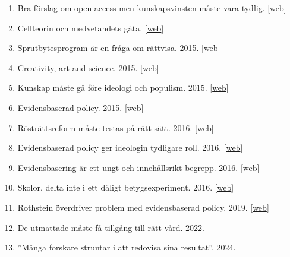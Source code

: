 \documentclass[10pt,a4paper,twocolumn]{article}
\begin{document}
\begin{enumerate}
    \item Bra förslag om open access men kunskapsvinsten måste vara tydlig. [\href{https://www.tidningencurie.se/kronikor/bra-forslag-om-open-access-men-kunskapsvinsten-maste-vara-tydlig}{web}]

    \item Cellteorin och medvetandets gåta. [\href{https://www.tidningencurie.se/kronikor/cellteorin-och-medvetandets-gata}{web}]

    \item Sprutbytesprogram är en fråga om rättvisa. 2015. [\href{http://www.ottar.se/artiklar/sprutbytesprogram-r-en-fr-ga-om-r-ttvisa}{web}]

    \item Creativity, art and science. 2015. [\href{hhttp://vision-forum.blogspot.se/2015/02/creativity-art-and-science.html}{web}]

    \item Kunskap måste gå före ideologi och populism. 2015. [\href{http://www.dn.se/debatt/kunskap-maste-ga-fore-ideologi-och-populism/}{web}]

    \item Evidensbaserad policy. 2015. [\href{https://drive.google.com/file/d/0B6Ii-rt5VieWajZRQjVEdDVHWnM/edit}{web}]

    \item Rösträttsreform måste testas på rätt sätt. 2016. [\href{http://www.dagenssamhalle.se/debatt/roestraettsreform-maste-testas-pa-raett-saett-24121}{web}]

    \item Evidensbaserad policy ger ideologin tydligare roll. 2016. [\href{http://www.frihetssmedjan.se/2016/04/gustav-nilsonne-med-dr-evidensbaserad-policy-ger-ideologin-tydligare-roll/}{web}]

    \item Evidensbasering är ett ungt och innehållsrikt begrepp. 2016. [\href{http://www.frihetssmedjan.se/2016/05/replik-evidensbasering-ar-ett-ungt-och-innehallsrikt-begrepp/}{web}]

    \item Skolor, delta inte i ett dåligt betygsexperiment. 2016. [\href{http://www.svd.se/skolor-delta-inte-i-ett-daligt-experiment}{web}]

    \item Rothstein överdriver problem med evidensbaserad policy. 2019. [\href{http://evidensbaseradpolicy.se/2019/11/12/rothstein-overdriver-problem-med-randomiserade-provningar-av-policy/}{web}]

    \item De utmattade måste få tillgång till rätt vård. 2022.

    \item ”Många forskare struntar i att redovisa sina resultat”. 2024.

\end{enumerate}
\end{document}
